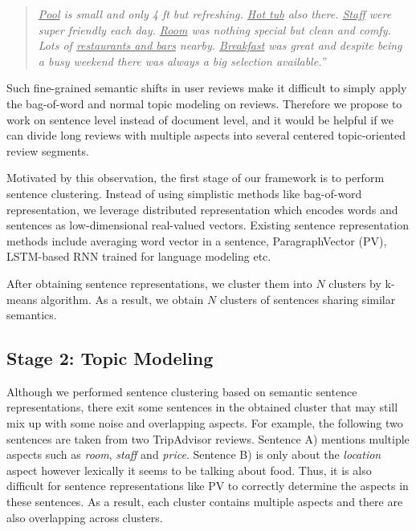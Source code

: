 \begin{quote}
\textit{\underline{Pool} is small and only 4 ft but refreshing. \underline{Hot tub} also there. \underline{Staff} were super friendly each day. \underline{Room} was nothing special but clean and comfy. Lots of \underline{restaurants and bars} nearby. \underline{Breakfast} was great and despite being a busy weekend there was always a big selection available.''}
\end{quote}


Such fine-grained semantic shifts in user reviews 
make it difficult to simply apply the bag-of-word  
and normal topic modeling on reviews.
Therefore we propose to work on sentence level instead 
of document level, and it would be helpful if we can divide long
reviews with multiple aspects into several centered topic-oriented review segments.

Motivated by this observation, the first stage of our framework is to perform
sentence clustering.  
Instead of using simplistic methods like bag-of-word representation, 
we leverage distributed representation which encodes words and sentences as low-dimensional real-valued vectors.
Existing  sentence representation methods include averaging word vector in a sentence, ParagraphVector (PV)\cite{le2014distributed}, LSTM-based RNN\cite{hochreiter1997long} trained for language modeling etc.

After obtaining sentence representations,
we cluster them into $N$ clusters by k-means algorithm\cite{kmeans}.
As a result, we obtain $N$ clusters of sentences sharing similar semantics.

\subsection{Stage 2: Topic Modeling}

Although we performed sentence clustering based on semantic sentence representations, there exit some sentences in the obtained cluster that may still mix up with some noise and overlapping aspects.
For example, the following two sentences are taken from two TripAdvisor reviews. 
Sentence A) mentions multiple aspects such as {\em room}, {\em staff} and {\em price}. 
Sentence B) is only about the {\em location} aspect however lexically it seems to be talking about food.
Thus, it is also difficult for sentence representations like PV to correctly determine the aspects in these sentences. 
As a result, each cluster contains multiple aspects and there are also overlapping across clusters. 


